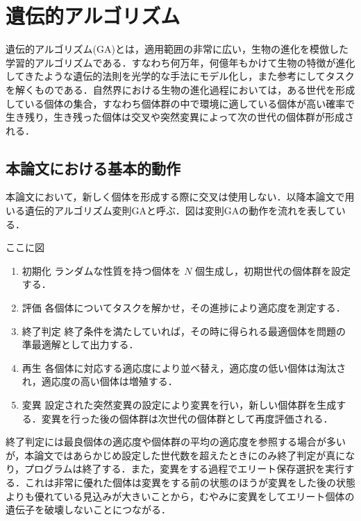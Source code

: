 \section{遺伝的アルゴリズム}
遺伝的アルゴリズム(GA)とは，適用範囲の非常に広い，生物の進化を模倣した学習的アルゴリズムである\cite{遺伝的アルゴリズム}．すなわち何万年，何億年もかけて生物の特徴が進化してきたような遺伝的法則を光学的な手法にモデル化し，また参考にしてタスクを解くものである．自然界における生物の進化過程においては，ある世代を形成している個体の集合，すなわち個体群の中で環境に適している個体が高い確率で生き残り，生き残った個体は交叉や突然変異によって次の世代の個体群が形成される．

\subsection{本論文における基本的動作}
本論文において，新しく個体を形成する際に交叉は使用しない．以降本論文で用いる遺伝的アルゴリズム変則GAと呼ぶ．図は変則GAの動作を流れを表している．

ここに図

\begin{enumerate}
    \item 初期化
    ランダムな性質を持つ個体を $ N $ 個生成し，初期世代の個体群を設定する．

    \item 評価
    各個体についてタスクを解かせ，その進捗により適応度を測定する．

    \item 終了判定
    終了条件を満たしていれば，その時に得られる最適個体を問題の準最適解として出力する．

    \item 再生
    各個体に対応する適応度により並べ替え，適応度の低い個体は淘汰され，適応度の高い個体は増殖する．

    \item 変異
    設定された突然変異の設定により変異を行い，新しい個体群を生成する．変異を行った後の個体群は次世代の個体群として再度評価される．
\end{enumerate}

終了判定には最良個体の適応度や個体群の平均の適応度を参照する場合が多いが，本論文ではあらかじめ設定した世代数を超えたときにのみ終了判定が真になり，プログラムは終了する．また，変異をする過程でエリート保存選択を実行する．これは非常に優れた個体は変異をする前の状態のほうが変異をした後の状態よりも優れている見込みが大きいことから，むやみに変異をしてエリート個体の遺伝子を破壊しないことにつながる．
